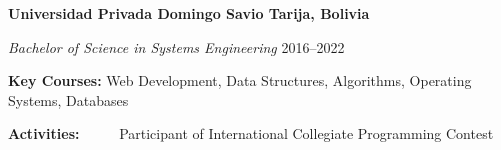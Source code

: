 \textbf{Universidad Privada Domingo Savio \hfill Tarija, Bolivia} \par
\textit{Bachelor of Science in Systems Engineering} \hfill 2016--2022\par
\textbf{Key Courses:} Web Development, Data Structures, Algorithms, Operating Systems, Databases\par
\textbf{Activities:} ~~~~~Participant of International Collegiate Programming Contest